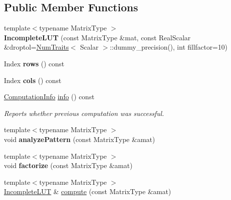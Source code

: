 \subsection*{Public Member Functions}
\begin{DoxyCompactItemize}
\item 
\mbox{\label{class_eigen_1_1_incomplete_l_u_t_a366a154352cb8cc486113238015f9ba2}} 
{\footnotesize template$<$typename Matrix\+Type $>$ }\\{\bfseries Incomplete\+L\+UT} (const Matrix\+Type \&mat, const Real\+Scalar \&droptol=\mbox{\hyperlink{struct_eigen_1_1_num_traits}{Num\+Traits}}$<$ Scalar $>$\+::dummy\+\_\+precision(), int fillfactor=10)
\item 
\mbox{\label{class_eigen_1_1_incomplete_l_u_t_abb76af447c1c8b2baad1241740d300e6}} 
Index {\bfseries rows} () const
\item 
\mbox{\label{class_eigen_1_1_incomplete_l_u_t_a5b1b721e5fe535c9cacbc3245243f4ec}} 
Index {\bfseries cols} () const
\item 
\mbox{\hyperlink{group__enums_ga85fad7b87587764e5cf6b513a9e0ee5e}{Computation\+Info}} \mbox{\hyperlink{class_eigen_1_1_incomplete_l_u_t_a941c7d34f15d7bc287e780636be0ee2b}{info}} () const
\begin{DoxyCompactList}\small\item\em Reports whether previous computation was successful. \end{DoxyCompactList}\item 
\mbox{\label{class_eigen_1_1_incomplete_l_u_t_ae732858eb360316a1573f91eaba8855f}} 
{\footnotesize template$<$typename Matrix\+Type $>$ }\\void {\bfseries analyze\+Pattern} (const Matrix\+Type \&amat)
\item 
\mbox{\label{class_eigen_1_1_incomplete_l_u_t_a2bd72541bcaeb2dee2540b911c151f41}} 
{\footnotesize template$<$typename Matrix\+Type $>$ }\\void {\bfseries factorize} (const Matrix\+Type \&amat)
\item 
{\footnotesize template$<$typename Matrix\+Type $>$ }\\\mbox{\hyperlink{class_eigen_1_1_incomplete_l_u_t}{Incomplete\+L\+UT}} \& \mbox{\hyperlink{class_eigen_1_1_incomplete_l_u_t_a488e37ab51d8ed37a297eeca521f1817}{compute}} (const Matrix\+Type \&amat)

\end{DoxyCompactItemize}
